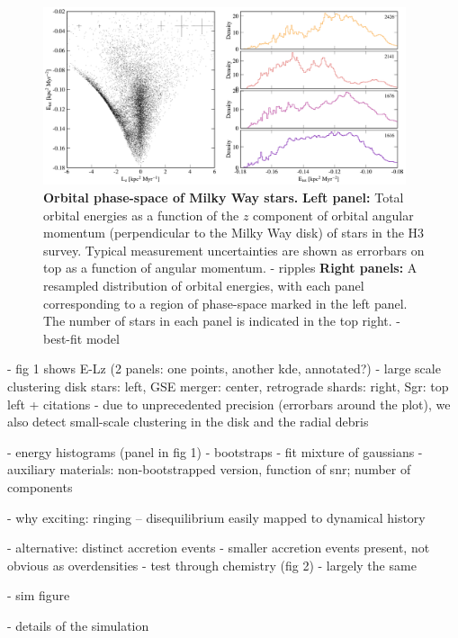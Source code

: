 \documentclass{natureprintstyle}
\begin{document}
\begin{figure}
\begin{center}
\includegraphics[width=0.95\textwidth]{fig1.pdf}
\caption{
\textbf{Orbital phase-space of Milky Way stars.}
{\bf Left panel:} Total orbital energies as a function of the $z$ component of orbital angular momentum (perpendicular to the Milky Way disk) of stars in the H3 survey.
Typical measurement uncertainties are shown as errorbars on top as a function of angular momentum.
- ripples
{\bf Right panels:} A resampled distribution of orbital energies, with each panel corresponding to a region of phase-space marked in the left panel.
The number of stars in each panel is indicated in the top right.
- best-fit model
}
\end{center}
\end{figure}

- fig 1 shows E-Lz (2 panels: one points, another kde, annotated?)
- large scale clustering disk stars: left, GSE merger: center, retrograde shards: right, Sgr: top left + citations
- due to unprecedented precision (errorbars around the plot), we also detect small-scale clustering in the disk and the radial debris

- energy histograms (panel in fig 1)
- bootstraps
- fit mixture of gaussians
- auxiliary materials: non-bootstrapped version, function of snr; number of components

- why exciting: ringing -- disequilibrium easily mapped to dynamical history

- alternative: distinct accretion events
- smaller accretion events present, not obvious as overdensities\cite{naidu:2020}
- test through chemistry (fig 2)
- largely the same

- sim figure

- details of the simulation
\end{document}
